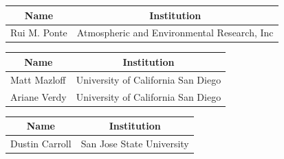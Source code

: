 \vspace{.25cm}

\vspace{.25cm}
\begin{center}
\begin{tabular}{m{} m{} }
    \multicolumn{1}{c}{\textbf{Name}} & \multicolumn{1}{c}{\textbf{Institution}} \\ \hline
    Rui M. Ponte & Atmospheric and Environmental Research, Inc\\ \hline
\end{tabular}
\end{center}


\begin{center}
\begin{tabular}{m{} m{} }
    \multicolumn{1}{c}{\textbf{Name}} & \multicolumn{1}{c}{\textbf{Institution}} \\ \hline
    Matt Mazloff  & University of California San Diego \\ \hline
    Ariane Verdy  & University of California San Diego \\ \hline
\end{tabular}
\end{center}

\vspace{.25cm}

\begin{center}
\begin{tabular}{m{} m{} }
    \multicolumn{1}{c}{\textbf{Name}} & \multicolumn{1}{c}{\textbf{Institution}} \\ \hline
    Dustin Carroll  & San Jose State University \\ \hline 
\end{tabular}
\end{center}

\vspace{.25cm}

